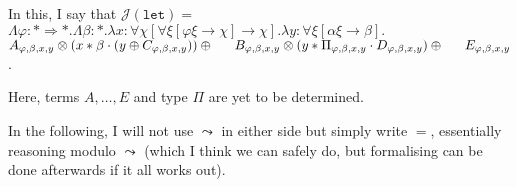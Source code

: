 \documentclass[runningheads,a4paper]{llncs}
\newcommand{\Termmap}{\mathcal{J}}
\newcommand{\arrtype}{\rightarrow}
\newcommand{\arrkind}{\Rightarrow}
\begin{document}
\newpage

In this, I say that $\Termmap(\mathtt{let}) =$ \\
$\Lambda \varphi : *
\arrkind *.\Lambda \beta : *.\lambda x : \forall \chi[\forall \xi[
\varphi\xi \arrtype \chi] \arrtype \chi].\lambda y : \forall \xi[
\alpha \xi \arrtype \beta].$ \\
\phantom{AB}\hfill
  $A_{\varphi,\beta,x,y} \otimes
    (x * \beta \cdot (y \oplus C_{\varphi,\beta,x,y}))
  \oplus \\
\phantom{AB}\hfill
  B_{\varphi,\beta,x,y} \otimes (y * \Pi_{\varphi,\beta,x,y} \cdot
    D_{\varphi,\beta,x,y})
  \oplus \\
\phantom{AB}\hfill
  E_{\varphi,\beta,x,y}$.

Here, terms $A,\dots,E$ and type $\Pi$ are yet to be determined.

In the following, I will not use $\leadsto$ in either side but simply
write $=$, essentially reasoning modulo $\leadsto$ (which I think we
can safely do, but formalising can be done afterwards if it all works
out).
\end{document}
